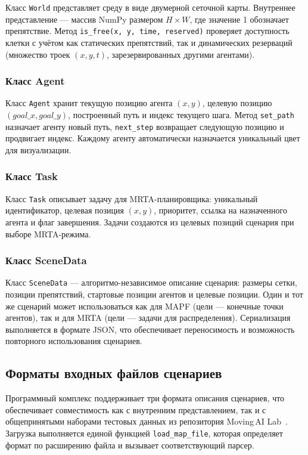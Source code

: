Класс \texttt{World} представляет среду в виде двумерной сеточной карты. Внутреннее представление --- массив NumPy размером $H \times W$, где значение 1 обозначает препятствие. Метод \texttt{is\_free(x, y, time, reserved)} проверяет доступность клетки с учётом как статических препятствий, так и динамических резерваций (множество троек $(x, y, t)$, зарезервированных другими агентами).

\subsubsection{Класс Agent}

Класс \texttt{Agent} хранит текущую позицию агента $(x, y)$, целевую позицию $(goal\_x, goal\_y)$, построенный путь и индекс текущего шага. Метод \texttt{set\_path} назначает агенту новый путь, \texttt{next\_step} возвращает следующую позицию и продвигает индекс. Каждому агенту автоматически назначается уникальный цвет для визуализации.

\subsubsection{Класс Task}

Класс \texttt{Task} описывает задачу для MRTA-планировщика: уникальный идентификатор, целевая позиция $(x, y)$, приоритет, ссылка на назначенного агента и флаг завершения. Задачи создаются из целевых позиций сценария при выборе MRTA-режима.

\subsubsection{Класс SceneData}

Класс \texttt{SceneData} --- алгоритмо-независимое описание сценария: размеры сетки, позиции препятствий, стартовые позиции агентов и целевые позиции. Один и тот же сценарий может использоваться как для MAPF (цели --- конечные точки агентов), так и для MRTA (цели --- задачи для распределения). Сериализация выполняется в формате JSON, что обеспечивает переносимость и возможность повторного использования сценариев.

\subsection{Форматы входных файлов сценариев}

Программный комплекс поддерживает три формата описания сценариев, что обеспечивает совместимость как с внутренним представлением, так и с общепринятыми наборами тестовых данных из репозитория Moving\,AI Lab~\cite{sturtevant2012benchmarks}. Загрузка выполняется единой функцией \texttt{load\_map\_file}, которая определяет формат по расширению файла и вызывает соответствующий парсер.


